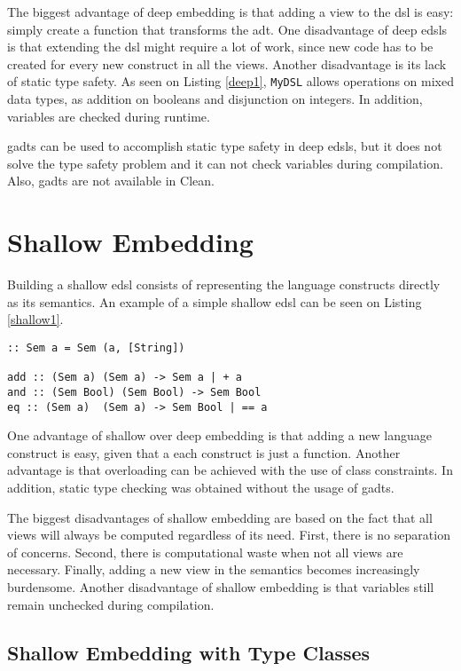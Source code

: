 The biggest advantage of deep embedding is that adding a view to the \ac{dsl} is easy: simply create a function that transforms the \ac{adt}. One disadvantage of deep \acp{edsl} is that extending the \ac{dsl} might require a lot of work, since new code has to be created for every new construct in all the views. Another disadvantage is its lack of static type safety. As seen on Listing \ref{deep1}, \texttt{MyDSL} allows operations on mixed data types, as addition on booleans and disjunction on integers. In addition, variables are checked during runtime.

\acp{gadt} can be used to accomplish static type safety in deep \acp{edsl}, but it does not solve the type safety problem and it can not check variables during compilation. Also, \acp{gadt} are not available in Clean.

\section{Shallow Embedding}
Building a shallow \ac{edsl} consists of representing the language constructs directly as its semantics. An example of a simple shallow \ac{edsl} can be seen on Listing \ref{shallow1}.

\begin{lstlisting}[caption=A simple shallow \ac{edsl},captionpos=b,label=shallow1]
:: Sem a = Sem (a, [String])

add :: (Sem a) (Sem a) -> Sem a | + a
and :: (Sem Bool) (Sem Bool) -> Sem Bool
eq :: (Sem a)  (Sem a) -> Sem Bool | == a
\end{lstlisting}

One advantage of shallow over deep embedding is that adding a new language construct is easy, given that a each construct is just a function. Another advantage is that overloading can be achieved with the use of class constraints. In addition, static type checking was obtained without the usage of \acp{gadt}. 

The biggest disadvantages of shallow embedding are based on the fact that all views will always be computed regardless of its need. First, there is no separation of concerns. Second, there is computational waste when not all views are necessary. Finally, adding a new view in the semantics becomes increasingly burdensome. Another disadvantage of shallow embedding is that variables still remain unchecked during compilation. 

\subsection{Shallow Embedding with Type Classes}

